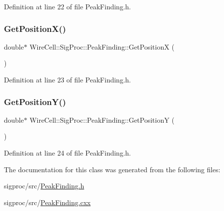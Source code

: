 Definition at line 22 of file Peak\+Finding.\+h.

\mbox{\label{class_wire_cell_1_1_sig_proc_1_1_peak_finding_a05680c66cae65c8d54244f19aaa3ba4a}} 
\subsubsection{\texorpdfstring{Get\+Position\+X()}{GetPositionX()}}
{\footnotesize\ttfamily double$\ast$ Wire\+Cell\+::\+Sig\+Proc\+::\+Peak\+Finding\+::\+Get\+PositionX (\begin{DoxyParamCaption}{ }\end{DoxyParamCaption})\hspace{0.3cm}{\ttfamily [inline]}}



Definition at line 23 of file Peak\+Finding.\+h.

\mbox{\label{class_wire_cell_1_1_sig_proc_1_1_peak_finding_ab148b0ccbdadeb7e418cb0f11b0dc3cd}} 
\subsubsection{\texorpdfstring{Get\+Position\+Y()}{GetPositionY()}}
{\footnotesize\ttfamily double$\ast$ Wire\+Cell\+::\+Sig\+Proc\+::\+Peak\+Finding\+::\+Get\+PositionY (\begin{DoxyParamCaption}{ }\end{DoxyParamCaption})\hspace{0.3cm}{\ttfamily [inline]}}



Definition at line 24 of file Peak\+Finding.\+h.



The documentation for this class was generated from the following files\+:\begin{DoxyCompactItemize}
\item 
sigproc/src/\hyperlink{_peak_finding_8h}{Peak\+Finding.\+h}\item 
sigproc/src/\hyperlink{_peak_finding_8cxx}{Peak\+Finding.\+cxx}\end{DoxyCompactItemize}
